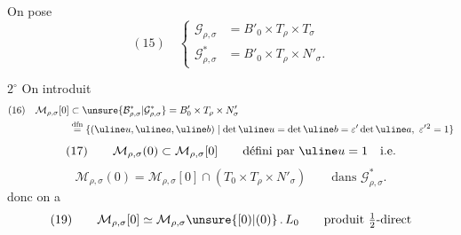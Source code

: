 On pose
\[
(15)\quad\left\{\begin{aligned}
 \mathcal{G}_{\rho,\sigma}&=B'_0\times T_\rho\times T_\sigma\\[4pt]
 \mathcal{G}_{\rho,\sigma}^{*}&=B'_0\times T_\rho\times N'_\sigma.
\end{aligned}\right.
\]




\textcircled{$2^\circ$} On introduit
\[
\begin{aligned}
(16)\quad \mathcal M_{\rho,\sigma}[0]
 &\subset \unsure{\mathcal B_{\rho,\sigma}^{*}|\mathcal G_{\rho,\sigma}^{*}}
   =B'_0\times T_\rho\times N'_\sigma\\
 &\mathrel{\mathop{=}\limits^{\mathrm{dfn}}}
 \{(\uline u,\uline a,\uline b)\mid
   \det\uline u=\det\uline b=\varepsilon'\det\uline a,\
   \varepsilon'{}^2=1\}
\end{aligned}
\]
\[
(17)\qquad \mathcal M_{\rho,\sigma}(0)\subset\mathcal M_{\rho,\sigma}[0]
 \qquad\text{défini par }\uline u=1\quad\text{i.e.}
\]
\[
 \mathcal M_{\rho,\sigma}(0)=\mathcal M_{\rho,\sigma}[0]
   \cap(T_0\times T_\rho\times N'_\sigma)
 \qquad\text{dans }\mathcal G_{\rho,\sigma}^{*}.
\]
donc on a
\[
(19)\qquad \mathcal M_{\rho,\sigma}[0]\simeq
  \mathcal M_{\rho,\sigma}\unsure{[0)|(0)}\, .\, L_0
 \qquad\text{produit }\tfrac12\text{-direct}
\]


